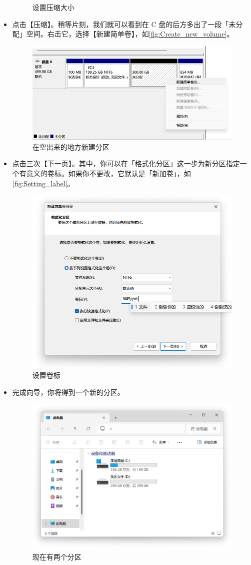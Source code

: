 \begin{itemize}
\begin{figure}[htb!]
      \caption{设置压缩大小}
      \label{fig:Setting_size}
    \end{figure}
  \item 点击【压缩】。稍等片刻，我们就可以看到在 C 盘的后方多出了一段「未分配」空间。右击它，选择【新建简单卷】，如\autoref{fig:Create_new_volume}。
  \begin{figure}[htb!]
    \centering
    \includegraphics[width=.6\textwidth]{assets/appendix/Create_new_volume.png}
    \caption{在空出来的地方新建分区}
    \label{fig:Create_new_volume}
  \end{figure}
  \item 点击三次【下一页】。其中，你可以在「格式化分区」这一步为新分区指定一个有意义的卷标。如果你不更改，它默认是「新加卷」，如\autoref{fig:Setting_label}。
  \begin{figure}[htb!]
    \centering
    \includegraphics[width=.6\textwidth]{assets/appendix/Setting_label.png}
    \caption{设置卷标}
    \label{fig:Setting_label}
  \end{figure}
  \item 完成向导，你将得到一个新的分区。
    \begin{figure}[htb!]
      \centering
      \includegraphics[width=.65\textwidth]{assets/appendix/Two_partitions.png}
      \caption{现在有两个分区}
      \label{fig:Two_partitions}
    \end{figure}
\end{itemize}

